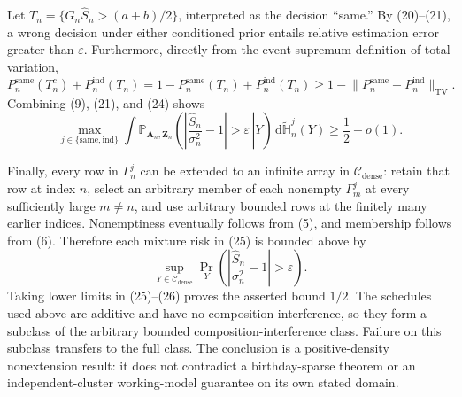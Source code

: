 Let \(T_n=\{G_n\widehat S_n>(a+b)/2\}\), interpreted as the decision ``same.'' By (20)--(21), a wrong decision under either conditioned prior entails relative estimation error greater than \(\varepsilon\). Furthermore, directly from the event-supremum definition of total variation,
\[
P_n^{\mathrm{same}}(T_n^c)+P_n^{\mathrm{ind}}(T_n)
=1-P_n^{\mathrm{same}}(T_n)+P_n^{\mathrm{ind}}(T_n)
\ge1-\lVert P_n^{\mathrm{same}}-P_n^{\mathrm{ind}}\rVert_{\mathrm{TV}}.
\tag{24}
\]
Combining (9), (21), and (24) shows
\[
\max_{j\in\{\mathrm{same},\mathrm{ind}\}}
\int
\mathbb P_{\mathbf A_n,\mathbf Z_n}\!\left(
\left.\left|\frac{\widehat S_n}{\sigma_n^2}-1\right|>\varepsilon
\,\right|Y\right)
\,\mathrm d\widetilde{\mathbb H}_n^j(Y)
\ge\frac12-o(1).
\tag{25}
\]

Finally, every row in \(\Gamma_n^j\) can be extended to an infinite array in \(\mathcal C_{\mathrm{dense}}\): retain that row at index \(n\), select an arbitrary member of each nonempty \(\Gamma_m^j\) at every sufficiently large \(m\ne n\), and use arbitrary bounded rows at the finitely many earlier indices. Nonemptiness eventually follows from (5), and membership follows from (6). Therefore each mixture risk in (25) is bounded above by
\[
\sup_{Y\in\mathcal C_{\mathrm{dense}}}
\Pr_Y\left(\left|\frac{\widehat S_n}{\sigma_n^2}-1\right|>\varepsilon\right).
\tag{26}
\]
Taking lower limits in (25)--(26) proves the asserted bound \(1/2\). The schedules used above are additive and have no composition interference, so they form a subclass of the arbitrary bounded composition-interference class. Failure on this subclass transfers to the full class. The conclusion is a positive-density nonextension result: it does not contradict a birthday-sparse theorem or an independent-cluster working-model guarantee on its own stated domain.
